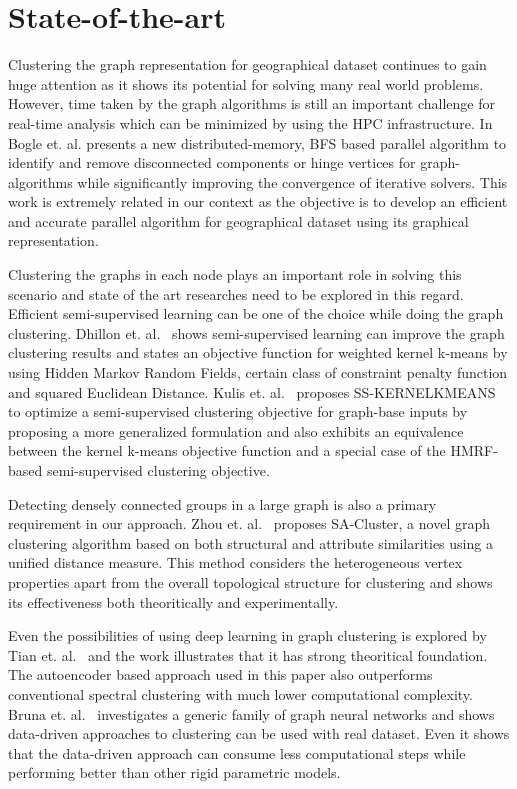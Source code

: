 \section{State-of-the-art}
\label{sec:state_of_the_art}

Clustering the graph representation for geographical dataset continues to gain 
huge attention as it shows its potential for solving many real world problems. 
However, time taken by the graph algorithms is still an important challenge for 
real-time analysis which can be minimized by using the HPC infrastructure.
In~\cite{parallel_graph_algorithm} Bogle et. al. presents a new 
distributed-memory, BFS based parallel algorithm to identify and remove 
disconnected components or hinge vertices for graph-algorithms while 
significantly improving the convergence of iterative solvers. This work is 
extremely related in our context as the objective is to develop an efficient 
and accurate parallel algorithm for geographical dataset using its graphical 
representation.

Clustering the graphs in each node plays an important role in solving this 
scenario and state of the art researches 
need to be explored in this regard. Efficient semi-supervised learning can be 
one of the choice while doing the graph 
clustering.
Dhillon et. al.~\cite{kernel_kmeans} shows semi-supervised learning can improve 
the  graph 
clustering results and states an objective function for weighted kernel k-means 
by using Hidden Markov Random Fields, certain class of constraint penalty 
function and squared Euclidean Distance. 
Kulis et. al.~\cite{semi_supervised_graph_clustering} proposes SS-KERNELKMEANS 
to optimize a semi-supervised clustering objective for graph-base inputs by 
proposing a more generalized formulation and also exhibits an equivalence 
between the kernel k-means objective function
and a special case of the HMRF-based
semi-supervised clustering objective.

Detecting densely connected groups in a large graph is also a primary 
requirement in our approach. Zhou et. 
al.~\cite{structural_attribute_similarity_clustering} proposes SA-Cluster, a 
novel graph clustering algorithm based on both structural and attribute 
similarities using a unified distance measure. This method considers the 
heterogeneous vertex properties apart from the overall topological structure 
for clustering and shows its effectiveness both theoritically and 
experimentally.

Even the possibilities of using deep learning in graph clustering is explored 
by Tian et. al.~\cite{deep_representation_graph_clustering} and the work 
illustrates that it has strong theoritical foundation. The autoencoder based 
approach used in this paper also outperforms conventional spectral clustering 
with much lower computational complexity.
Bruna et. al.~\cite{community_detection} investigates a generic family of graph 
neural networks and shows data-driven approaches to clustering can be used with 
real dataset. Even it shows that the data-driven approach can consume less 
computational steps while performing better than other rigid parametric models.
